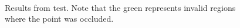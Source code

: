 \documentclass[12pt]{report}
\begin{document}
\begin{figure}[!h]
\centering
\\
\caption{Results from test.  Note that the green represents invalid regions where the point
         was occluded.}
\end{figure}
\end{document}
